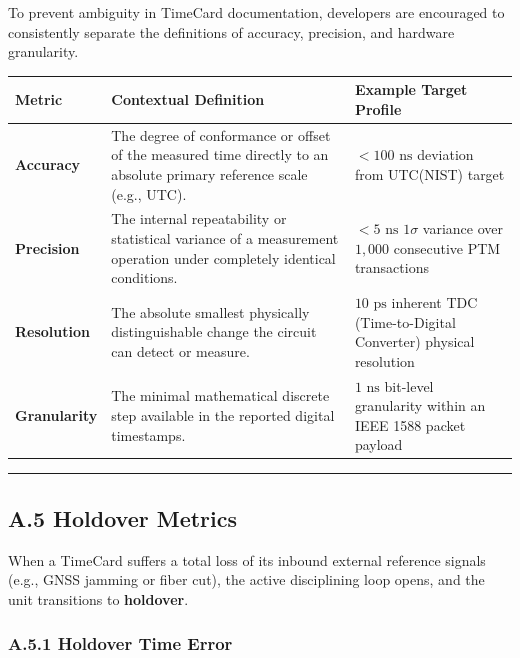 \documentclass[
]{article}
\newcounter{none} %
\begin{document}
To prevent ambiguity in TimeCard documentation, developers are
encouraged to consistently separate the definitions of accuracy,
precision, and hardware granularity.

{\def\LTcaptype{none} %
\begin{longtable}[]{@{}
  >{\raggedright\arraybackslash}p{}
  >{\raggedright\arraybackslash}p{}
  >{\raggedright\arraybackslash}p{}@{}}
\toprule\noalign{}
Metric & Contextual Definition & Example Target Profile \\
\midrule\noalign{}
\endhead
\bottomrule\noalign{}
\endlastfoot
\textbf{Accuracy} & The degree of conformance or offset of the measured
time directly to an absolute primary reference scale (e.g., UTC). &
\(<100\text{ ns}\) deviation from UTC(NIST) target \\
\textbf{Precision} & The internal repeatability or statistical variance
of a measurement operation under completely identical conditions. &
\(<5\text{ ns}\) \(1\sigma\) variance over \(1,\!000\) consecutive PTM
transactions \\
\textbf{Resolution} & The absolute smallest physically distinguishable
change the circuit can detect or measure. & \(10\text{ ps}\) inherent
TDC (Time-to-Digital Converter) physical resolution \\
\textbf{Granularity} & The minimal mathematical discrete step available
in the reported digital timestamps. & \(1\text{ ns}\) bit-level
granularity within an IEEE 1588 packet payload \\
\end{longtable}
}

\begin{center}\rule{0.5\linewidth}{0.5pt}\end{center}

\subsection{A.5 Holdover Metrics}\label{a.5-holdover-metrics}

When a TimeCard suffers a total loss of its inbound external reference
signals (e.g., GNSS jamming or fiber cut), the active disciplining loop
opens, and the unit transitions to \textbf{holdover}.

\subsubsection{A.5.1 Holdover Time
Error}\label{a.5.1-holdover-time-error}
\end{document}
